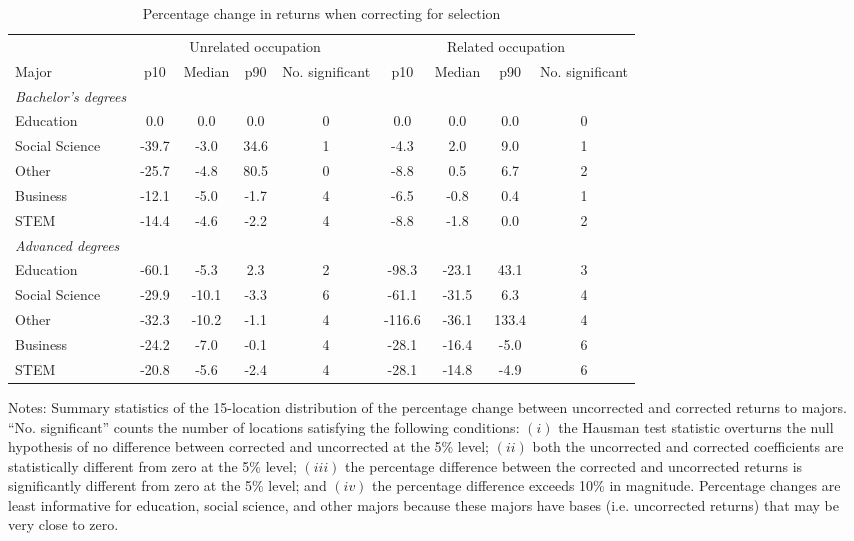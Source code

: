 \begin{table}[ht]
\caption{Percentage change in returns when correcting for selection}
\label{tab:aggpctreturn}
\centering
\begin{threeparttable}
\begin{tabular}{lcccccccc}
\toprule
                & \multicolumn{4}{c}{Unrelated occupation} & \multicolumn{4}{c}{Related occupation} \\
\cmidrule(lr{.5em}){2-5}\cmidrule(lr{.5em}){6-9}
Major           & p10   & Median & p90 & No. significant  & p10   & Median & p90 & No. significant  \\ 
\midrule
\emph{Bachelor's degrees}       &&&&&& \\
\qquad{}Education & 0.0 & 0.0 & 0.0 & 0 & 0.0 & 0.0 & 0.0 & 0    \\
\qquad{}Social Science & -39.7 & -3.0 & 34.6 & 1 & -4.3 & 2.0 & 9.0 & 1    \\
\qquad{}Other & -25.7 & -4.8 & 80.5 & 0 & -8.8 & 0.5 & 6.7 & 2    \\
\qquad{}Business & -12.1 & -5.0 & -1.7 & 4 & -6.5 & -0.8 & 0.4 & 1    \\
\qquad{}STEM & -14.4 & -4.6 & -2.2 & 4 & -8.8 & -1.8 & 0.0 & 2    \\
\emph{Advanced degrees}       &&&&&& \\
\qquad{}Education & -60.1 & -5.3 & 2.3 & 2 & -98.3 & -23.1 & 43.1 & 3    \\
\qquad{}Social Science & -29.9 & -10.1 & -3.3 & 6 & -61.1 & -31.5 & 6.3 & 4    \\
\qquad{}Other & -32.3 & -10.2 & -1.1 & 4 & -116.6 & -36.1 & 133.4 & 4    \\
\qquad{}Business & -24.2 & -7.0 & -0.1 & 4 & -28.1 & -16.4 & -5.0 & 6    \\
\qquad{}STEM & -20.8 & -5.6 & -2.4 & 4 & -28.1 & -14.8 & -4.9 & 6    \\
\bottomrule
\end{tabular}
{\footnotesize {\raggedright Notes: Summary statistics of the 15-location distribution of the percentage change between uncorrected and corrected returns to majors. ``No. significant'' counts the number of locations satisfying the following conditions: $(i)$ the Hausman test statistic overturns the null hypothesis of no difference between corrected and uncorrected at the 5\% level; $(ii)$ both the uncorrected and corrected coefficients are statistically different from zero at the 5\% level; $(iii)$ the percentage difference between the corrected and uncorrected returns is significantly different from zero at the 5\% level; and $(iv)$ the percentage difference exceeds 10\% in magnitude. Percentage changes are least informative for education, social science, and other majors because these majors have bases (i.e. uncorrected returns) that may be very close to zero.}}
\end{threeparttable}
\end{table}
